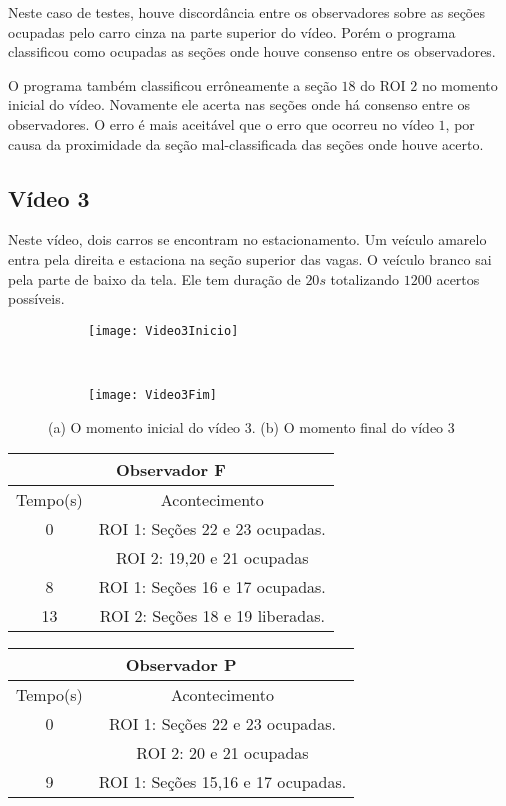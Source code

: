 Neste caso de testes, houve discordância entre os observadores sobre as seções ocupadas pelo carro cinza na parte superior do vídeo. Porém o programa classificou como ocupadas as seções onde houve consenso entre os observadores.

O programa também classificou errôneamente a seção $18$ do ROI $2$ no momento inicial do vídeo. Novamente ele acerta nas seções onde há consenso entre os observadores. O erro é mais aceitável que o erro que ocorreu no vídeo $1$, por causa da proximidade da seção mal-classificada das seções onde houve acerto.

\subsection{Vídeo 3}

Neste vídeo, dois carros se encontram no estacionamento. Um veículo amarelo entra pela direita e estaciona na seção superior das vagas. O veículo branco sai pela parte de baixo da tela. Ele tem duração de $20s$ totalizando $1200$ acertos possíveis.

\begin{figure}[!h]
\centering
\begin{subfigure}{.5\textwidth}
\centering
\texttt{[image: Video3Inicio]}
\caption{}
\end{subfigure}\
\begin{subfigure}{.5\textwidth}
\centering
\texttt{[image: Video3Fim]}
\caption{}
\end{subfigure}
\centering
\caption{(a) O momento inicial do vídeo 3. (b) O momento final do vídeo 3}%
\label{}%
\end{figure}

\begin{center}
\begin{tabular}{|c||c|}
\hline
\multicolumn{2}{|c|}{Observador F}  \\ \hline \hline
Tempo(s) & Acontecimento \\ \hline
0 & ROI 1: Seções 22 e 23 ocupadas. \\
 & ROI 2: 19,20 e 21 ocupadas \\ \hline
8 & ROI 1: Seções 16 e 17 ocupadas. \\ \hline
13 & ROI 2: Seções 18 e 19 liberadas. \\
\hline
\end{tabular}
\end{center}

\begin{center}
\begin{tabular}{|c||c|}
\hline
\multicolumn{2}{|c|}{Observador P}  \\ \hline \hline
Tempo(s) & Acontecimento \\ \hline
0 & ROI 1: Seções 22 e 23 ocupadas. \\
 & ROI 2: 20 e 21 ocupadas \\ \hline
9 & ROI 1: Seções 15,16 e 17 ocupadas. \\
\hline
\end{tabular}
\end{center}

